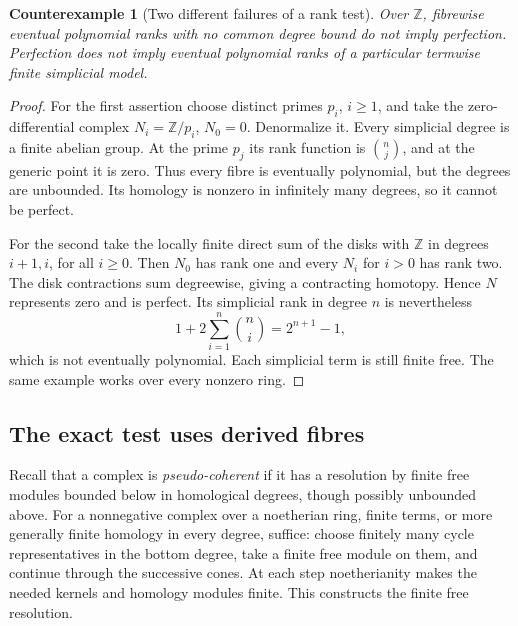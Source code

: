 \documentclass[11pt,a4paper]{article}
\newtheorem{counterexample}[theorem]{Counterexample}
\theoremstyle{definition}
\newcommand{\Z}{\mathbb Z}
\begin{document}
\begin{counterexample}[Two different failures of a rank test]\label{ex:rank-tests}
Over $\Z$, fibrewise eventual polynomial ranks with no common degree
bound do not imply perfection. Perfection does not imply eventual
polynomial ranks of a particular termwise finite simplicial model.
\end{counterexample}
\begin{proof}
For the first assertion choose distinct primes $p_i$, $i\ge1$, and
take the zero-differential complex $N_i=\Z/p_i$, $N_0=0$.
Denormalize it. Every simplicial degree is a finite abelian group.
At the prime $p_j$ its rank function is $\binom nj$, and at the
generic point it is zero. Thus every fibre is eventually polynomial,
but the degrees are unbounded. Its homology is nonzero in infinitely
many degrees, so it cannot be perfect.

For the second take the locally finite direct sum of the disks with
$\Z$ in degrees $i+1,i$, for all $i\ge0$. Then $N_0$ has rank one
and every $N_i$ for $i>0$ has rank two. The disk contractions sum
degreewise, giving a contracting homotopy. Hence $N$ represents zero
and is perfect. Its simplicial rank in degree $n$ is nevertheless
\[
 1+2\sum_{i=1}^n\binom ni=2^{n+1}-1,
\]
which is not eventually polynomial. Each simplicial term is still
finite free. The same example works over every nonzero ring.
\end{proof}

\subsection{The exact test uses derived fibres}
Recall that a complex is \emph{pseudo-coherent} if it has a resolution
by finite free modules bounded below in homological degrees, though
possibly unbounded above. For a nonnegative complex over a noetherian
ring, finite terms, or more generally finite homology in every degree,
suffice: choose finitely many cycle representatives in the bottom
degree, take a finite free module on them, and continue through the
successive cones. At each step noetherianity makes the needed kernels
and homology modules finite. This constructs the finite free resolution.
\end{document}

